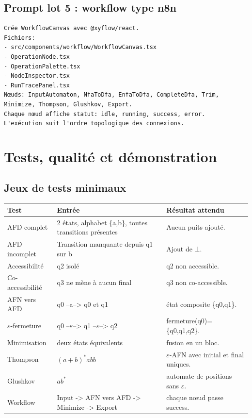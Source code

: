 \documentclass[11pt,a4paper]{report}
\newcommand{\eps}{\ensuremath{\varepsilon}}
\begin{document}
\section{Prompt lot 5 : workflow type n8n}
\begin{lstlisting}
Crée WorkflowCanvas avec @xyflow/react.
Fichiers:
- src/components/workflow/WorkflowCanvas.tsx
- OperationNode.tsx
- OperationPalette.tsx
- NodeInspector.tsx
- RunTracePanel.tsx
Nœuds: InputAutomaton, NfaToDfa, EnfaToDfa, CompleteDfa, Trim, Minimize, Thompson, Glushkov, Export.
Chaque nœud affiche statut: idle, running, success, error.
L'exécution suit l'ordre topologique des connexions.
\end{lstlisting}

\chapter{Tests, qualité et démonstration}

\section{Jeux de tests minimaux}
\begin{longtable}{p{}p{}p{}}
\toprule
\textbf{Test} & \textbf{Entrée} & \textbf{Résultat attendu}\\
\midrule
AFD complet & 2 états, alphabet \{a,b\}, toutes transitions présentes & Aucun puits ajouté.\\
AFD incomplet & Transition manquante depuis q1 sur b & Ajout de $\bot$.\\
Accessibilité & q2 isolé & q2 non accessible.\\
Co-accessibilité & q3 ne mène à aucun final & q3 non co-accessible.\\
AFN vers AFD & q0 --a--> q0 et q1 & état composite \{q0,q1\}.\\
\eps-fermeture & q0 --\eps--> q1 --\eps--> q2 & fermeture(q0)=\{q0,q1,q2\}.\\
Minimisation & deux états équivalents & fusion en un bloc.\\
Thompson & $(a+b)^*abb$ & \eps-AFN avec initial et final uniques.\\
Glushkov & $ab^*$ & automate de positions sans \eps.\\
Workflow & Input -> AFN vers AFD -> Minimize -> Export & chaque nœud passe success.\\
\bottomrule
\end{longtable}
\end{document}
